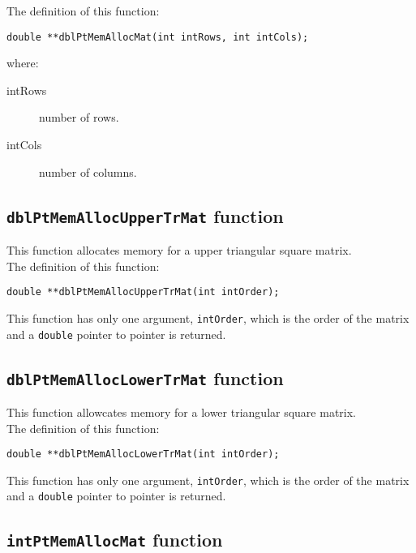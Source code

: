 The definition of this function:
%
\begin{verbatim}
double **dblPtMemAllocMat(int intRows, int intCols);
\end{verbatim}
%
where:
%
\begin{description}
\item[intRows] number of rows.
\item[intCols] number of columns.
\end{description}

\subsection{\texttt{dblPtMemAllocUpperTrMat} function} \label{sec:dblPtMemAllocUpperTrMat}

This function allocates memory for a upper triangular square matrix.\\

The definition of this function:
%
\begin{verbatim}
double **dblPtMemAllocUpperTrMat(int intOrder);
\end{verbatim}

This function has only one argument, \texttt{intOrder}, which is the order of the matrix and a \texttt{double} pointer to pointer is returned.\\

\subsection{\texttt{dblPtMemAllocLowerTrMat} function} \label{sec:dblPtMemAllocLowerTrMat}

This function allowcates memory for a lower triangular square matrix.\\

The definition of this function:
%
\begin{verbatim}
double **dblPtMemAllocLowerTrMat(int intOrder);
\end{verbatim}

This function has only one argument, \texttt{intOrder}, which is the order of the matrix and a \texttt{double} pointer to pointer is returned.\\

\subsection{\texttt{intPtMemAllocMat} function} \label{sec:intPtMemAllocMat}

